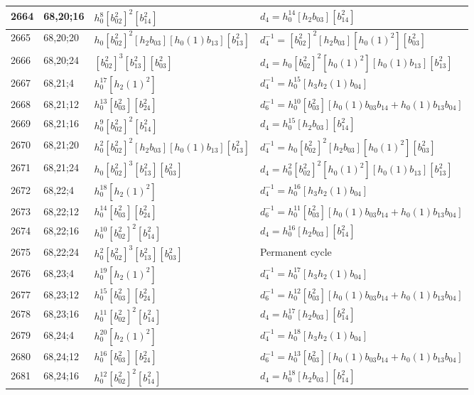 \documentclass{article}
\begin{document}
\begin{longtable}{|l|l|>{\raggedright\arraybackslash}p{6cm}|>{\raggedright\arraybackslash}p{6cm}|}
\hline
2664 & 68,20;16 & $h_0^8[b_{02}^2]^2[b_{14}^2]$ &$d_{4}=h_0^{14}[h_2b_{03}][b_{14}^2]$\\
\hline
2665 & 68,20;20 & $h_0[b_{02}^2]^2[h_2b_{03}][h_0(1)b_{13}][b_{13}^2]$ & $d_{4}^{-1}=[b_{02}^2]^2[h_2b_{03}][h_0(1)^2][b_{03}^2]$\\
\hline
2666 & 68,20;24 & $[b_{02}^2]^3[b_{13}^2][b_{03}^2]$ &$d_{4}=h_0[b_{02}^2]^2[h_0(1)^2][h_0(1)b_{13}][b_{13}^2]$\\
\hline
2667 & 68,21;4 & $h_0^{17}[h_2(1)^2]$ & $d_{4}^{-1}=h_0^{15}[h_3h_2(1)b_{04}]$\\
\hline
2668 & 68,21;12 & $h_0^{13}[b_{03}^2][b_{24}^2]$ & $d_{6}^{-1}=h_0^{10}[b_{03}^2][h_0(1)b_{03}b_{14} + h_0(1)b_{13}b_{04}]$\\
\hline
2669 & 68,21;16 & $h_0^9[b_{02}^2]^2[b_{14}^2]$ &$d_{4}=h_0^{15}[h_2b_{03}][b_{14}^2]$\\
\hline
2670 & 68,21;20 & $h_0^2[b_{02}^2]^2[h_2b_{03}][h_0(1)b_{13}][b_{13}^2]$ & $d_{4}^{-1}=h_0[b_{02}^2]^2[h_2b_{03}][h_0(1)^2][b_{03}^2]$\\
\hline
2671 & 68,21;24 & $h_0[b_{02}^2]^3[b_{13}^2][b_{03}^2]$ &$d_{4}=h_0^2[b_{02}^2]^2[h_0(1)^2][h_0(1)b_{13}][b_{13}^2]$\\
\hline
2672 & 68,22;4 & $h_0^{18}[h_2(1)^2]$ & $d_{4}^{-1}=h_0^{16}[h_3h_2(1)b_{04}]$\\
\hline
2673 & 68,22;12 & $h_0^{14}[b_{03}^2][b_{24}^2]$ & $d_{6}^{-1}=h_0^{11}[b_{03}^2][h_0(1)b_{03}b_{14} + h_0(1)b_{13}b_{04}]$\\
\hline
2674 & 68,22;16 & $h_0^{10}[b_{02}^2]^2[b_{14}^2]$ &$d_{4}=h_0^{16}[h_2b_{03}][b_{14}^2]$\\
\hline
2675 & 68,22;24 & $h_0^2[b_{02}^2]^3[b_{13}^2][b_{03}^2]$ & Permanent cycle\\
\hline
2676 & 68,23;4 & $h_0^{19}[h_2(1)^2]$ & $d_{4}^{-1}=h_0^{17}[h_3h_2(1)b_{04}]$\\
\hline
2677 & 68,23;12 & $h_0^{15}[b_{03}^2][b_{24}^2]$ & $d_{6}^{-1}=h_0^{12}[b_{03}^2][h_0(1)b_{03}b_{14} + h_0(1)b_{13}b_{04}]$\\
\hline
2678 & 68,23;16 & $h_0^{11}[b_{02}^2]^2[b_{14}^2]$ &$d_{4}=h_0^{17}[h_2b_{03}][b_{14}^2]$\\
\hline
2679 & 68,24;4 & $h_0^{20}[h_2(1)^2]$ & $d_{4}^{-1}=h_0^{18}[h_3h_2(1)b_{04}]$\\
\hline
2680 & 68,24;12 & $h_0^{16}[b_{03}^2][b_{24}^2]$ & $d_{6}^{-1}=h_0^{13}[b_{03}^2][h_0(1)b_{03}b_{14} + h_0(1)b_{13}b_{04}]$\\
\hline
2681 & 68,24;16 & $h_0^{12}[b_{02}^2]^2[b_{14}^2]$ &$d_{4}=h_0^{18}[h_2b_{03}][b_{14}^2]$\\

\end{longtable}
\end{document}
